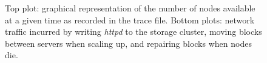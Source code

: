 \begin{figure}[ht]
    \centering
    
    \caption{Top plot: graphical representation of the number of nodes available at a given time as recorded in the trace file. Bottom plots: network traffic incurred by writing \textit{httpd} to the storage cluster, moving blocks between servers when scaling up, and repairing blocks when nodes die.}
    \label{fig:trace-plot}
\end{figure}